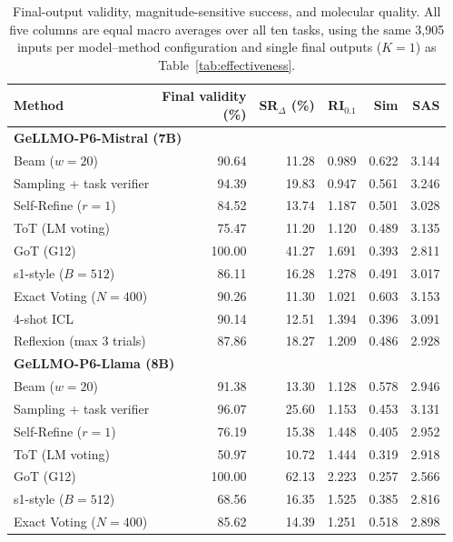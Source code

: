 \begin{table}[t]
\centering\EvalTableFont
\setlength{\tabcolsep}{4pt}\renewcommand{\arraystretch}{1.10}
\caption{Final-output validity, magnitude-sensitive success, and molecular quality. All five columns are equal macro averages over all ten tasks, using the same 3,905 inputs per model--method configuration and single final outputs ($K=1$) as Table~\ref{tab:effectiveness}.}
\label{tab:quality}
\begin{tabular*}{\linewidth}{@{\extracolsep{\fill}}l r r r r r@{}}
\toprule
Method & \shortstack{Final validity\\(\%)} & \shortstack{SR$_\Delta$\\(\%)} & RI$_{0.1}$ & Sim & SAS \\
\midrule
\multicolumn{6}{l}{\textbf{GeLLMO-P6-Mistral (7B)}} \\
Beam ($w=20$) & 90.64 & 11.28 & 0.989 & 0.622 & 3.144 \\
Sampling + task verifier & 94.39 & 19.83 & 0.947 & 0.561 & 3.246 \\
Self-Refine ($r=1$) & 84.52 & 13.74 & 1.187 & 0.501 & 3.028 \\
ToT (LM voting) & 75.47 & 11.20 & 1.120 & 0.489 & 3.135 \\
GoT (G12) & 100.00 & 41.27 & 1.691 & 0.393 & 2.811 \\
s1-style ($B=512$) & 86.11 & 16.28 & 1.278 & 0.491 & 3.017 \\
Exact Voting ($N=400$) & 90.26 & 11.30 & 1.021 & 0.603 & 3.153 \\
4-shot ICL & 90.14 & 12.51 & 1.394 & 0.396 & 3.091 \\
Reflexion (max 3 trials) & 87.86 & 18.27 & 1.209 & 0.486 & 2.928 \\
\midrule
\multicolumn{6}{l}{\textbf{GeLLMO-P6-Llama (8B)}} \\
Beam ($w=20$) & 91.38 & 13.30 & 1.128 & 0.578 & 2.946 \\
Sampling + task verifier & 96.07 & 25.60 & 1.153 & 0.453 & 3.131 \\
Self-Refine ($r=1$) & 76.19 & 15.38 & 1.448 & 0.405 & 2.952 \\
ToT (LM voting) & 50.97 & 10.72 & 1.444 & 0.319 & 2.918 \\
GoT (G12) & 100.00 & 62.13 & 2.223 & 0.257 & 2.566 \\
s1-style ($B=512$) & 68.56 & 16.35 & 1.525 & 0.385 & 2.816 \\
Exact Voting ($N=400$) & 85.62 & 14.39 & 1.251 & 0.518 & 2.898 \\

\end{tabular*}
\end{table}
